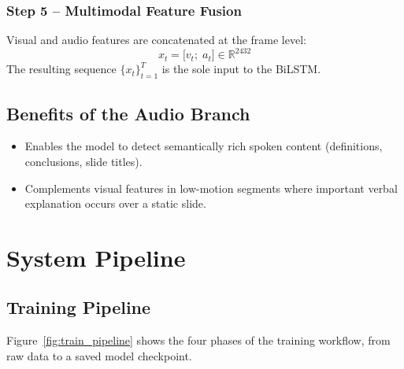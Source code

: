\documentclass[12pt, a4paper]{report}
\begin{document}
\subsection{Step 5 -- Multimodal Feature Fusion}
Visual and audio features are concatenated at the frame level:
\begin{equation}
  x_t = \bigl[v_t;\; a_t\bigr] \in \mathbb{R}^{2432}
\end{equation}
The resulting sequence $\{x_t\}_{t=1}^{T}$ is the sole input to the BiLSTM.

\section{Benefits of the Audio Branch}
\begin{itemize}[leftmargin=1.5cm]
  \item Enables the model to detect semantically rich spoken content (definitions,
        conclusions, slide titles).
  \item Complements visual features in low-motion segments where important verbal
        explanation occurs over a static slide.
\end{itemize}

\chapter{System Pipeline}

\section{Training Pipeline}

Figure~\ref{fig:train_pipeline} shows the four phases of the training workflow,
from raw data to a saved model checkpoint.
\end{document}

